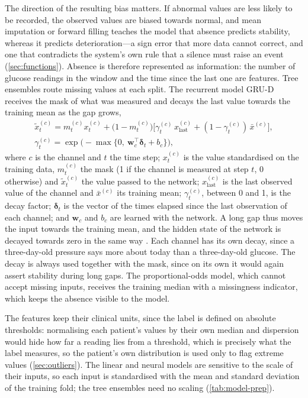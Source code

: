 The direction of the resulting bias matters. If abnormal values are less likely to be recorded, the observed values are biased towards normal, and mean imputation or forward filling teaches the model that absence predicts stability, whereas it predicts deterioration---a sign error that more data cannot correct, and one that contradicts the system's own rule that a silence must raise an event (\cref{sec:functions}). Absence is therefore represented as information: the number of glucose readings in the window and the time since the last one are features. Tree ensembles route missing values at each split. The recurrent model GRU-D \parencite{che2018} receives the mask of what was measured and decays the last value towards the training mean as the gap grows,
\begin{equation}
\begin{gathered}
  \tilde{x}^{(c)}_t = m^{(c)}_t x^{(c)}_t + \bigl(1 - m^{(c)}_t\bigr)\bigl[\gamma^{(c)}_t\, x^{(c)}_{\text{last}} + (1-\gamma^{(c)}_t)\,\bar{x}^{(c)}\bigr], \\
  \gamma^{(c)}_t = \exp\bigl(-\max\{0,\ \mathbf{w}_c^{\top}\boldsymbol{\delta}_t + b_c\}\bigr),
\end{gathered}
\end{equation}
where $c$ is the channel and $t$ the time step; $x^{(c)}_t$ is the value standardised on the training data, $m^{(c)}_t$ the mask (1 if the channel is measured at step $t$, 0 otherwise) and $\tilde{x}^{(c)}_t$ the value passed to the network; $x^{(c)}_{\text{last}}$ is the last observed value of the channel and $\bar{x}^{(c)}$ its training mean; $\gamma^{(c)}_t$, between 0 and 1, is the decay factor; $\boldsymbol{\delta}_t$ is the vector of the times elapsed since the last observation of each channel; and $\mathbf{w}_c$ and $b_c$ are learned with the network. A long gap thus moves the input towards the training mean, and the hidden state of the network is decayed towards zero in the same way \parencite{che2018}. Each channel has its own decay, since a three-day-old pressure says more about today than a three-day-old glucose. The decay is always used together with the mask, since on its own it would again assert stability during long gaps. The proportional-odds model, which cannot accept missing inputs, receives the training median with a missingness indicator, which keeps the absence visible to the model.

The features keep their clinical units, since the label is defined on absolute thresholds: normalising each patient's values by their own median and dispersion would hide how far a reading lies from a threshold, which is precisely what the label measures, so the patient's own distribution is used only to flag extreme values (\cref{sec:outliers}). The linear and neural models are sensitive to the scale of their inputs, so each input is standardised with the mean and standard deviation of the training fold; the tree ensembles need no scaling (\cref{tab:model-prep}).

